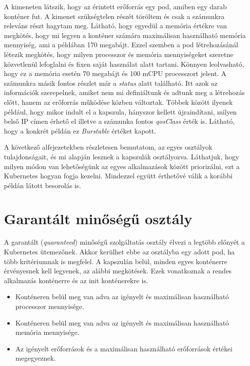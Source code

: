 A kimeneten látszik, hogy az érintett erőforrás egy pod, amiben egy darab konténer fut.
A kimenet szükségtelen részét töröltem és csak a számunkra releváns részt hagytam meg.
Látható, hogy egyedül a memória értékre van megkötés, hogy mi legyen a konténer számára maximálisan használható memória mennyiség, ami a példában 170 megabájt. 
Ezzel szemben a pod létrehozásánál létezik megkötés, hogy milyen processzor és memória mennyiségeket szeretne közvetlenül lefoglalni és fixen saját használat alatt tartani.
Könnyen leolvasható, hogy ez a memória esetén 70 megabájt és 100 mCPU processzort jelent.
A számunkra másik fontos részlet már a \textit{status} alatt található.
Itt azok az információk szerepelnek, amiket nem mi definiáltunk és adtunk meg a létrehozás előtt, hanem az erőforrás működése közben változtak.
Többek között ilyenek például, hogy mikor indult el a kapszula, hányszor kellett újraindítani, milyen belső IP címen érhető el illetve a számunka fontos \textit{qosClass} érték is.
Látható, hogy a konkrét példán ez \textit{Burstable} értéket kapott.

\lstset{caption=Adott kapszula minőségosztályának vizsgálata, label=get_qos_example}


A következő alfejezetekben részletesen bemutatom, az egyes osztályok tulajdonságait, és mi alapján lesznek a kapszulák osztályozva.
Láthatjuk, hogy milyen módon van lehetőségünk az egyes alkalmazások között priorizálni, ezt a Kubernetes hogyan fogja kezelni.
Mindezzel együtt érthetővé válik a korábbi példán látott besorolás is.


\section{Garantált minőségű osztály}

A garantált (\textit{quaranteed}) minőségű szolgáltatás osztály élvezi a legtöbb előnyét a Kubernetes ütemezőnek.
Akkor kerülhet ebbe az osztályba egy adott pod, ha több kritériumnak is megfelel.
A kapszulán belül, minden egyes konténerre érvényesnek kell legyenek, az alábbi megkötések. 
Ezek vonatkoznak a rendes alkalmazás konténerre és az init konténerekre is.

\begin{itemize}
    \item Konténeren belül meg van adva az igényelt és maximálisan használható processzor mennyisége.
    \item Konténeren belül meg van adva az igényelt és maximálisan használható memória mennyisége.
    \item Az igényelt erőforrások és a maximálisan használható erőforrások értékei megegyeznek.
\end{itemize}


